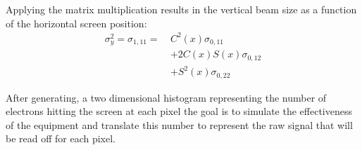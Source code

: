 Applying the matrix multiplication results in the vertical beam size as a
function of the horizontal screen position:
\begin{equation}
	\begin{split}
		\sigma_y^2 = \sigma_{1,11} =\: & C^2(x)\sigma_{0,11} \\
									&+ 2C(x)S(x)\sigma_{0,12} \\
									&+ S^2(x)\sigma_{0,22}
	\end{split}
\end{equation}



After generating, a two dimensional histogram representing the number of
electrons hitting the screen at each pixel the goal is to simulate the
effectiveness of the equipment and translate this number to represent the raw
signal that will be read off for each pixel.

